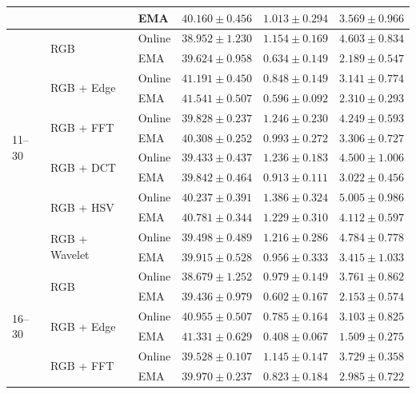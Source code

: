 \begin{table}[htbp]
\begin{tabular}{lllccc}
 &  & EMA & $40.160 \pm 0.456$ & $1.013 \pm 0.294$ & $3.569 \pm 0.966$ \\
\midrule
\multirow{12}{*}{11--30} & \multirow{2}{*}{RGB} & Online & $38.952 \pm 1.230$ & $1.154 \pm 0.169$ & $4.603 \pm 0.834$ \\
 &  & EMA & $39.624 \pm 0.958$ & $0.634 \pm 0.149$ & $\mathbf{2.189 \pm 0.547}$ \\
\addlinespace[2pt]
 & \multirow{2}{*}{RGB + Edge} & Online & $41.191 \pm 0.450$ & $0.848 \pm 0.149$ & $3.141 \pm 0.774$ \\
 &  & EMA & $\mathbf{41.541 \pm 0.507}$ & $\mathbf{0.596 \pm 0.092}$ & $2.310 \pm 0.293$ \\
\addlinespace[2pt]
 & \multirow{2}{*}{RGB + FFT} & Online & $39.828 \pm 0.237$ & $1.246 \pm 0.230$ & $4.249 \pm 0.593$ \\
 &  & EMA & $40.308 \pm 0.252$ & $0.993 \pm 0.272$ & $3.306 \pm 0.727$ \\
\addlinespace[2pt]
 & \multirow{2}{*}{RGB + DCT} & Online & $39.433 \pm 0.437$ & $1.236 \pm 0.183$ & $4.500 \pm 1.006$ \\
 &  & EMA & $39.842 \pm 0.464$ & $0.913 \pm 0.111$ & $3.022 \pm 0.456$ \\
\addlinespace[2pt]
 & \multirow{2}{*}{RGB + HSV} & Online & $40.237 \pm 0.391$ & $1.386 \pm 0.324$ & $5.005 \pm 0.986$ \\
 &  & EMA & $40.781 \pm 0.344$ & $1.229 \pm 0.310$ & $4.112 \pm 0.597$ \\
\addlinespace[2pt]
 & \multirow{2}{*}{RGB + Wavelet} & Online & $39.498 \pm 0.489$ & $1.216 \pm 0.286$ & $4.784 \pm 0.778$ \\
 &  & EMA & $39.915 \pm 0.528$ & $0.956 \pm 0.333$ & $3.415 \pm 1.033$ \\
\midrule
\multirow{12}{*}{16--30} & \multirow{2}{*}{RGB} & Online & $38.679 \pm 1.252$ & $0.979 \pm 0.149$ & $3.761 \pm 0.862$ \\
 &  & EMA & $39.436 \pm 0.979$ & $0.602 \pm 0.167$ & $2.153 \pm 0.574$ \\
\addlinespace[2pt]
 & \multirow{2}{*}{RGB + Edge} & Online & $40.955 \pm 0.507$ & $0.785 \pm 0.164$ & $3.103 \pm 0.825$ \\
 &  & EMA & $\mathbf{41.331 \pm 0.629}$ & $\mathbf{0.408 \pm 0.067}$ & $\mathbf{1.509 \pm 0.275}$ \\
\addlinespace[2pt]
 & \multirow{2}{*}{RGB + FFT} & Online & $39.528 \pm 0.107$ & $1.145 \pm 0.147$ & $3.729 \pm 0.358$ \\
 &  & EMA & $39.970 \pm 0.237$ & $0.823 \pm 0.184$ & $2.985 \pm 0.722$ \\

\end{tabular}
\end{table}
